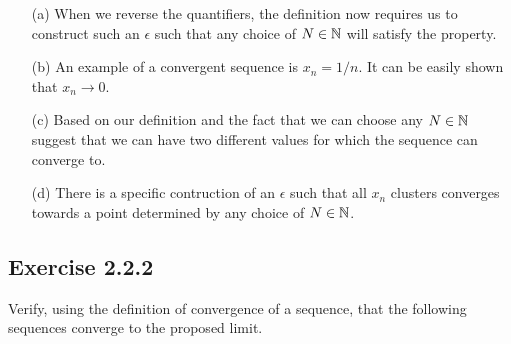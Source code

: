 \begin{enumerate}
    \item [(a)] When we reverse the quantifiers, the definition now requires us to construct such an \( \epsilon  \) such that any choice of \( N \in \mathbb{N} \) will satisfy the property. 
    \item [(b)] An example of a convergent sequence is \( x_n = 1/n \). It can be easily shown that \( x_n \to 0 \).  
    \item [(c)] Based on our definition and the fact that we can choose any \( N \in \mathbb{N} \) suggest that we can have two different values for which the sequence can converge to.
    \item [(d)] There is a specific contruction of an \( \epsilon\) such that all \( x_n \) clusters converges towards a point determined by any choice of \( N \in \mathbb{N} \). 
\end{enumerate}

\subsection{Exercise 2.2.2}
Verify, using the definition of convergence of a sequence, that the following sequences converge to the 
proposed limit. 

